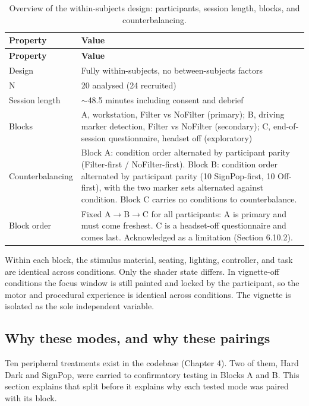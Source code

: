 \begin{longtable}{p{}|p{}}
\caption{Overview of the within-subjects design: participants, session length, blocks, and
counterbalancing.}\\
\hline
\textbf{Property} & \textbf{Value} \\
\hline
\endfirsthead
\hline
\textbf{Property} & \textbf{Value} \\
\hline
\endhead
\hline
Design & Fully within-subjects, no between-subjects factors \\
N & 20 analysed (24 recruited) \\
Session length & $\sim$48.5 minutes including consent and debrief \\
Blocks & A, workstation, Filter vs NoFilter (primary); B, driving marker detection, Filter vs NoFilter (secondary); C, end-of-session questionnaire, headset off (exploratory) \\
Counterbalancing & Block A: condition order alternated by participant parity (Filter-first / NoFilter-first). Block B: condition order alternated by participant parity (10 SignPop-first, 10 Off-first), with the two marker sets alternated against condition. Block C carries no conditions to counterbalance. \\
Block order & Fixed A$\rightarrow$B$\rightarrow$C for all participants: A is primary and must come freshest. C is a headset-off questionnaire and comes last. Acknowledged as a limitation (Section 6.10.2). \\
\hline
\end{longtable}

Within each block, the stimulus material, seating, lighting, controller, and task are identical
across conditions. Only the shader state differs. In vignette-off conditions the focus window is
still painted and locked by the participant, so the motor and procedural experience is identical
across conditions. The vignette is isolated as the sole independent variable.

\subsection{Why these modes, and why these pairings}

Ten peripheral treatments exist in the codebase (Chapter 4). Two of them, Hard Dark and SignPop, were
carried to confirmatory testing in Blocks A and B. This section explains that split before it explains
why each tested mode was paired with its block.

